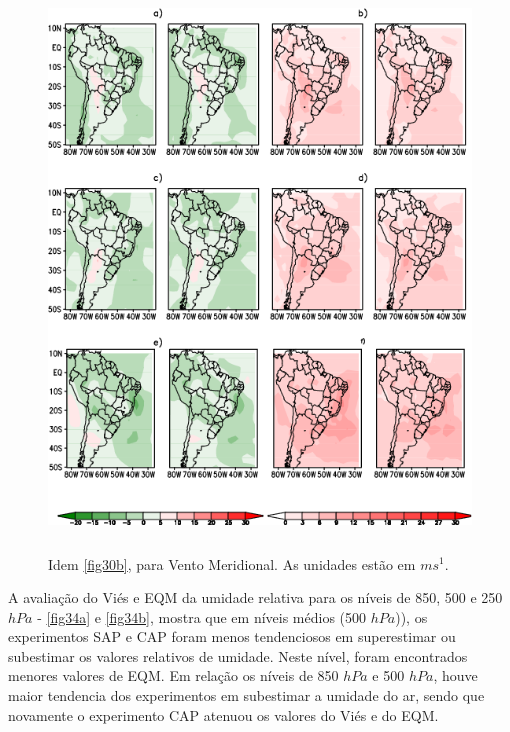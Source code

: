 \begin{figure}[!hbp]
\centering
\includegraphics[height=15cm]{./figs/campo_vies_eqm-vvel.png}
\caption{Idem \autoref{fig30b}, para Vento Meridional. As unidades estão em $ms^{1}$.}
\label{fig33b}
\end{figure}

A avaliação do Viés e EQM da umidade relativa para os níveis de 850, 500 e 250 $hPa$ - \autoref{fig34a} e \autoref{fig34b}, mostra que em níveis médios (500 $hPa$)), os experimentos SAP e CAP foram menos tendenciosos em superestimar ou subestimar os valores relativos de umidade. Neste nível, foram encontrados menores valores de EQM. Em relação os níveis de 850 $hPa$ e 500 $hPa$, houve maior tendencia dos experimentos em subestimar a umidade do ar, sendo que novamente o experimento CAP atenuou os valores do Viés e do EQM.

